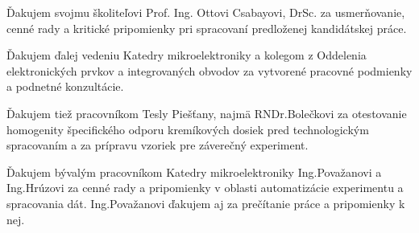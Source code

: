 \par Ďakujem svojmu školiteľovi Prof. Ing. Ottovi Csabayovi, DrSc. za
usmerňovanie, cenné rady a kritické pripomienky pri spracovaní
predloženej kandidátskej práce.
\par Ďakujem ďalej vedeniu Katedry mikroelektroniky a kolegom z
Oddelenia elektronických prvkov a integrovaných obvodov za vytvorené
pracovné podmienky a podnetné konzultácie.
\par Ďakujem tiež pracovníkom Tesly Piešťany, najmä RNDr.Bolečkovi za
otestovanie homogenity špecifického odporu kremíkových dosiek pred
technologickým spracovaním a za prípravu vzoriek pre záverečný
experiment.
\par Ďakujem bývalým pracovníkom Katedry mikroelektroniky
Ing.Považanovi a Ing.Hrúzovi za cenné rady a pripomienky v oblasti
automatizácie experimentu a spracovania dát. Ing.Považanovi ďakujem aj
za prečítanie práce a pripomienky k nej.
